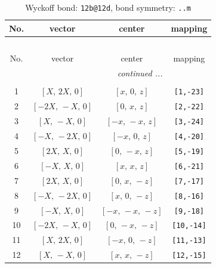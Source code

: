 \documentclass[fleqn,8pt]{jsarticle}
\begin{document}
\begin{longtable}{cccc}
\caption{Wyckoff bond: {\tt 12b@12d}, bond symmetry: {\tt ..m}}
 \\
 \hline \hline
No. & vector & center & mapping \\ \hline \endfirsthead

\multicolumn{3}{l}{\tablename\ \thetable{}} \\
 \hline \hline
No. & vector & center & mapping \\ \hline \endhead

 \hline \hline
\multicolumn{3}{r}{\footnotesize\it continued ...} \\ \endfoot

 \hline \hline
\multicolumn{3}{r}{} \\ \endlastfoot

1 & $\left[ X,\, 2 X,\, 0 \right]$ & $\left[ x,\, 0,\, z \right]$ & {\tt [1,-23]} \\ \hline
2 & $\left[ - 2 X,\, - X,\, 0 \right]$ & $\left[ 0,\, x,\, z \right]$ & {\tt [2,-22]} \\ \hline
3 & $\left[ X,\, - X,\, 0 \right]$ & $\left[ - x,\, - x,\, z \right]$ & {\tt [3,-24]} \\ \hline
4 & $\left[ - X,\, - 2 X,\, 0 \right]$ & $\left[ - x,\, 0,\, z \right]$ & {\tt [4,-20]} \\ \hline
5 & $\left[ 2 X,\, X,\, 0 \right]$ & $\left[ 0,\, - x,\, z \right]$ & {\tt [5,-19]} \\ \hline
6 & $\left[ - X,\, X,\, 0 \right]$ & $\left[ x,\, x,\, z \right]$ & {\tt [6,-21]} \\ \hline
7 & $\left[ 2 X,\, X,\, 0 \right]$ & $\left[ 0,\, x,\, - z \right]$ & {\tt [7,-17]} \\ \hline
8 & $\left[ - X,\, - 2 X,\, 0 \right]$ & $\left[ x,\, 0,\, - z \right]$ & {\tt [8,-16]} \\ \hline
9 & $\left[ - X,\, X,\, 0 \right]$ & $\left[ - x,\, - x,\, - z \right]$ & {\tt [9,-18]} \\ \hline
10 & $\left[ - 2 X,\, - X,\, 0 \right]$ & $\left[ 0,\, - x,\, - z \right]$ & {\tt [10,-14]} \\ \hline
11 & $\left[ X,\, 2 X,\, 0 \right]$ & $\left[ - x,\, 0,\, - z \right]$ & {\tt [11,-13]} \\ \hline
12 & $\left[ X,\, - X,\, 0 \right]$ & $\left[ x,\, x,\, - z \right]$ & {\tt [12,-15]} \\
\end{longtable}
\renewcommand{\arraystretch}{1.2}
\end{document}
